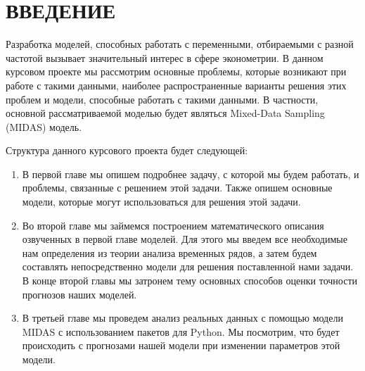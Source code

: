\documentclass[a4paper, 14pt]{extarticle}
\begin{document}
	\section{ВВЕДЕНИЕ}
	Разработка моделей, способных работать с переменными, отбираемыми с разной частотой вызывает значительный интерес в сфере эконометрии. В данном курсовом проекте мы рассмотрим основные проблемы, которые возникают при работе с такими данными, наиболее распространенные варианты решения этих проблем и модели, способные работать с такими данными. В частности, основной рассматриваемой моделью будет являться Mixed-Data Sampling (MIDAS) модель.
	
	Структура данного курсового проекта будет следующей:
	\begin{enumerate}
		\item В первой главе мы опишем подробнее задачу, с которой мы будем работать, и проблемы, связанные с решением этой задачи. Также опишем основные модели, которые могут использоваться для решения этой задачи.
		\item Во второй главе мы займемся построением математического описания озвученных в первой главе моделей. Для этого мы введем все необходимые нам определения из теории анализа временных рядов, а затем будем составлять непосредственно модели для решения поставленной нами задачи. В конце второй главы мы затронем тему основных способов оценки точности прогнозов наших моделей.
		\item В третьей главе мы проведем анализ реальных данных с помощью модели MIDAS с использованием пакетов для Python. Мы посмотрим, что будет происходить с прогнозами нашей модели при изменении параметров этой модели.
	\end{enumerate}
	
	  
	\newpage
\end{document}
